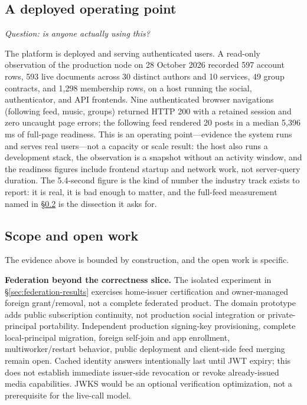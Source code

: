 \documentclass[sigconf, nonacm]{acmart}
\begin{document}
\subsection{A deployed operating point}
\label{sec:operating}

\emph{Question: is anyone actually using this?}

The platform is deployed and serving authenticated users. A read-only
observation of the production node on 28 October 2026 recorded 597 account
rows, 593 live documents across 30 distinct authors and 10 services, 49
group contracts, and 1,298 membership rows, on a host running the social,
authenticator, and API frontends. Nine authenticated browser navigations
(following feed, music, groups) returned HTTP 200 with a retained session and
zero uncaught page errors; the following feed rendered 20 posts in a median
5,396\,ms of full-page readiness. This is an operating point---evidence the
system runs and serves real users---not a capacity or scale result: the host
also runs a development stack, the observation is a snapshot without an
activity window, and the readiness figures include frontend startup and
network work, not server-query duration. The 5.4-second figure is the kind of
number the industry track exists to report: it is real, it is bad enough to
matter, and the full-feed measurement named in \S\ref{sec:limits} is the
dissection it asks for.

\subsection{Scope and open work}
\label{sec:limits}

The evidence above is bounded by construction, and the open work is
specific.

\textbf{Federation beyond the correctness slice.} The isolated experiment in
\S\ref{sec:federation-results} exercises home-issuer certification and
owner-managed foreign grant/removal, not a complete federated product. The
domain prototype adds public subscription continuity, not production social
integration or private-principal portability. Independent production
signing-key provisioning, complete local-principal migration, foreign
self-join and app enrollment, multiworker/restart behavior, public deployment
and client-side feed merging remain open. Cached identity answers
intentionally last until JWT expiry; this does not establish immediate
issuer-side revocation or revoke already-issued media capabilities. JWKS
would be an optional verification optimization, not a prerequisite for the
live-call model.
\end{document}
